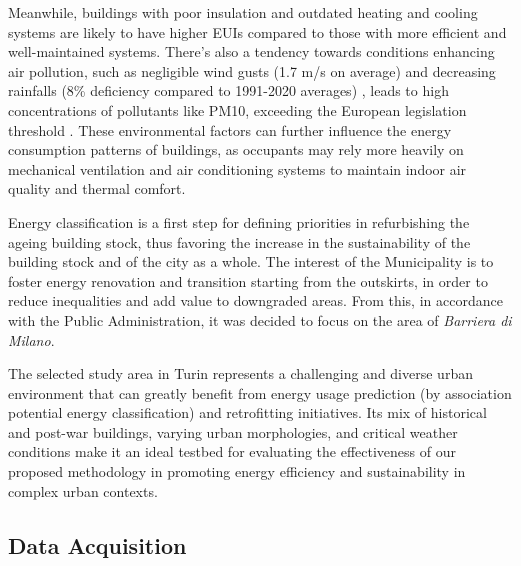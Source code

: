 \documentclass[preprint,12pt]{elsarticle}
\begin{document}
    Meanwhile, buildings with poor insulation and outdated heating and cooling systems are likely to have higher EUIs compared to those with more efficient and well-maintained systems. There's also a tendency towards conditions enhancing air pollution, such as negligible wind gusts (1.7 m/s on average) and decreasing rainfalls (8\% deficiency compared to 1991-2020 averages) \cite{ClimateARPA}, leads to high concentrations of pollutants like PM10, exceeding the European legislation threshold \cite{EuropDirective}. These environmental factors can further influence the energy consumption patterns of buildings, as occupants may rely more heavily on mechanical ventilation and air conditioning systems to maintain indoor air quality and thermal comfort.

    Energy classification is a first step for defining priorities in refurbishing the ageing building stock, thus favoring the increase in the sustainability of the building stock and of the city as a whole. The interest of the Municipality is to foster energy renovation and transition starting from the outskirts, in order to reduce inequalities and add value to downgraded areas. From this, in accordance with the Public Administration, it was decided to focus on the area of \textit{Barriera di Milano}.


    The selected study area in Turin represents a challenging and diverse urban environment that can greatly benefit from energy usage prediction (by association potential energy classification) and retrofitting initiatives. Its mix of historical and post-war buildings, varying urban morphologies, and critical weather conditions make it an ideal testbed for evaluating the effectiveness of our proposed methodology in promoting energy efficiency and sustainability in complex urban contexts.


\subsection{Data Acquisition}
\end{document}
